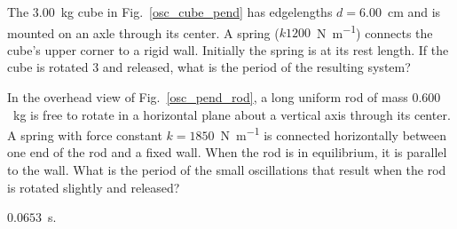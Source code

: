 \begin{problem}\label{prb:osc_cube_pend}
	The $3.00$~kg cube in Fig.~\ref{osc_cube_pend} has edgelengths $d = 6.00$~cm and is mounted on an axle through its center. A spring ($k  1200$~\si{\newton\per\meter}) connects the cube’s upper corner to a rigid wall. Initially the spring is at its rest length. If the cube is rotated 3 and released, what is the period of the resulting system?
\end{problem}


\begin{problem}\label{prb:osc_pend_rod}
	In the overhead view of Fig.~\ref{osc_pend_rod}, a long uniform rod of mass $0.600$~kg is free to rotate in a horizontal plane about a vertical axis through its center. A spring with force constant $k = 1850$~\si{\newton\per\meter} is connected horizontally between one end of the rod and a fixed wall. When the rod is in equilibrium, it is parallel to the wall. What is the period of the small oscillations that result when the rod is rotated slightly and released?
	\begin{solution}
		$0.0653$~\si{\second}.
	\end{solution}
\end{problem}

